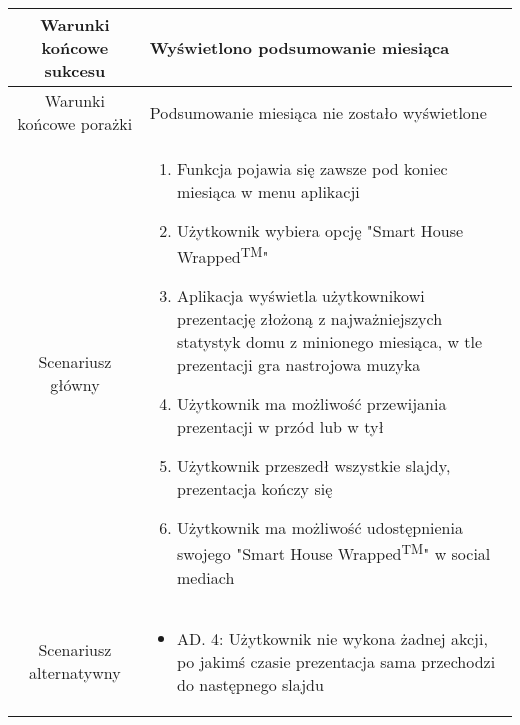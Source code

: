 \documentclass{article}
\begin{document}
\begin{enumerate}
\begin{enumerate}
\begin{table}[H]
\begin{tabular}{|c|p{7cm}|}
						\hline
						Warunki końcowe sukcesu & Wyświetlono podsumowanie miesiąca                                                                                                                                                                                                                                                                                                                                                                                                                                                                                                                                                                         \\
						\hline
						Warunki końcowe porażki & Podsumowanie miesiąca nie zostało wyświetlone                                                                                                                                                                                                                                                                                                                                                                                                                                                                                                                                                             \\
						\hline
						Scenariusz główny       & \begin{enumerate}\item Funkcja pojawia się zawsze pod koniec miesiąca w menu aplikacji

\item Użytkownik wybiera opcję "Smart House Wrapped\textsuperscript{TM}"

\item Aplikacja wyświetla użytkownikowi prezentację złożoną z najważniejszych statystyk domu z minionego miesiąca, w tle prezentacji gra nastrojowa muzyka

\item Użytkownik ma możliwość przewijania prezentacji w przód lub w tył

\item Użytkownik przeszedł wszystkie slajdy, prezentacja kończy się

\item Użytkownik ma możliwość udostępnienia swojego "Smart House Wrapped\textsuperscript{TM}" w social mediach\end{enumerate} \\
						\hline
						Scenariusz alternatywny & \begin{itemize}\item AD. 4: Użytkownik nie wykona żadnej akcji, po jakimś czasie prezentacja sama przechodzi do następnego slajdu


\end{itemize}
\end{tabular}
\end{table}
\end{enumerate}
\end{enumerate}
\end{document}
